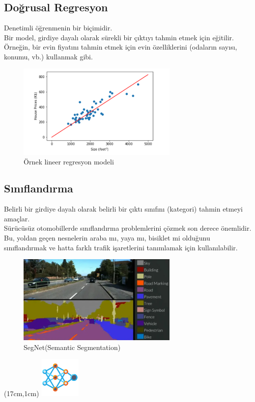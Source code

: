 \documentclass{article}
\begin{document}
\subsection{Doğrusal Regresyon}
Denetimli öğrenmenin bir biçimidir.\\[5pt]
Bir model, girdiye dayalı olarak sürekli bir çıktıyı tahmin etmek için eğitilir. Örneğin, bir evin fiyatını tahmin etmek için evin özelliklerini (odaların sayısı, konumu, vb.) kullanmak gibi.
\begin{figure}[h]
  \centering
  \includegraphics[width=0.7\textwidth]{image/Resim35.png} %
  \caption{Örnek lineer regresyon modeli \cite{pardoe2020applied}}
  \label{fig:python33}  
\end{figure}
\subsection{Sınıflandırma}
Belirli bir girdiye dayalı olarak belirli bir çıktı sınıfını (kategori) tahmin etmeyi amaçlar.\\[5pt]
Sürücüsüz otomobillerde sınıflandırma problemlerini çözmek son derece önemlidir. Bu, yoldan geçen nesnelerin araba mı, yaya mı, bisiklet mi olduğunu sınıflandırmak ve hatta farklı trafik işaretlerini tanımlamak için kullanılabilir.\\[2pt]
\begin{figure}[h]
  \centering
  \includegraphics[width=0.7\textwidth]{image/Resim36.png} %
  \caption{SegNet(Semantic Segmentation)\cite{deepika2017obstacle}}
  \label{fig:python34}  
\end{figure}
\newpage
\begin{textblock*}{5cm}(17cm,1cm) %
    \includegraphics[width=2cm]{image/sinir.png} %
\end{textblock*}
\end{document}
